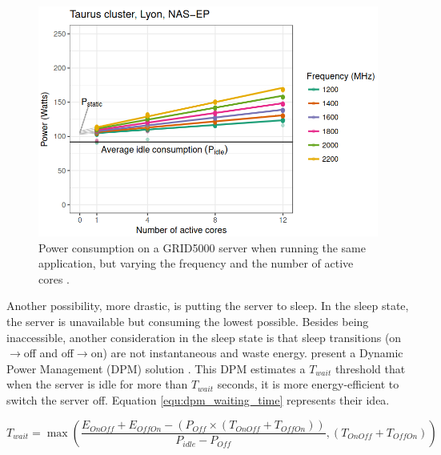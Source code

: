 \begin{figure}[!htb]
    \centering
    \includegraphics[scale=0.4]{Images/Related_works/cpu_usage.png}
    \caption[Power consumption on a GRID5000 server when running the same application, but varying the frequency and the number of active cores.]{Power consumption on a GRID5000 server when running the same application, but varying the frequency and the number of active cores \cite{heinrich2017predicting}.}
    \label{fig:cpu_frequency_consumption}
\end{figure}

Another possibility, more drastic, is putting the server to sleep. In the sleep state, the server is unavailable but consuming the lowest possible. Besides being inaccessible, another consideration in the sleep state is that sleep transitions (on$\rightarrow$off and off$\rightarrow$on) are not instantaneous and waste energy. \citeauthor{rais2018quantifying} present a Dynamic Power Management (DPM) solution \cite{rais2018quantifying}. This DPM estimates a $T_{wait}$ threshold that when the server is idle for more than $T_{wait}$ seconds, it is more energy-efficient to switch the server off. Equation \ref{equ:dpm_waiting_time} represents their idea.

\begin{equation}
    \label{equ:dpm_waiting_time}
    T_{wait} = \max(\frac{E_{OnOff} + E_{OffOn} - (P_{Off} \times (T_{OnOff} + T_{OffOn}))}{P_{idle} - P_{Off}}, (T_{OnOff} + T_{OffOn}))
\end{equation}

